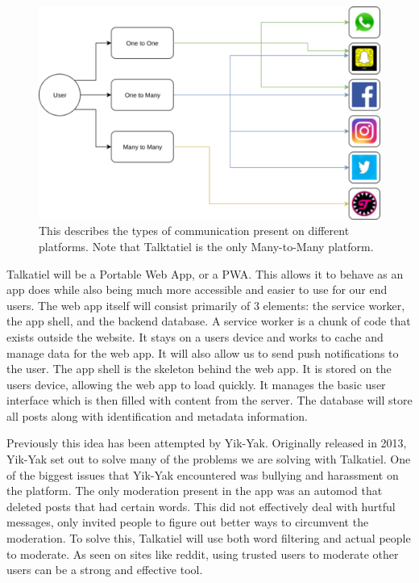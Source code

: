 \documentclass[12pt]{article}
\begin{document}
\begin{figure}
  \includegraphics[scale=0.75]{similarServices}
  \caption{This describes the types of communication present on different platforms. Note that Talktatiel is the only Many-to-Many platform.}
\end{figure}
	Talkatiel will be a Portable Web App, or a PWA.  This allows it to behave as an app does while also being much more accessible and easier to use for our end users.  The web app itself will consist primarily of 3 elements:   the service worker, the app shell, and the backend database.  A service worker is a chunk of code that exists outside the website.  It stays on a users device and works to cache and manage data for the web app.  It will also allow us to send push notifications to the user.  The app shell is the skeleton behind the web app.  It is stored on the users device, allowing the web app to load quickly.  It manages the basic user interface which is then filled with content from the server.  The database will store all posts along with identification and metadata information.

	Previously this idea has been attempted by Yik-Yak.  Originally released in 2013, Yik-Yak set out to solve many of the problems we are solving with Talkatiel.  One of the biggest issues that Yik-Yak encountered was bullying and harassment on the platform\cite{item1}.  The only moderation present in the app was an automod that deleted posts that had certain words.  This did not effectively deal with hurtful messages, only invited people to figure out better ways to circumvent the moderation.  To solve this, Talkatiel will use both word filtering and actual people to moderate.  As seen on sites like reddit, using trusted users to moderate other users can be a strong and effective tool.
\end{document}

